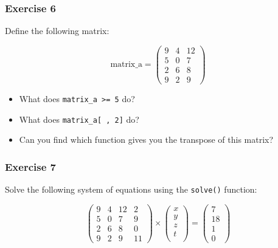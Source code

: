 \documentclass[]{gitbook}
\providecommand{\tightlist}{%
  \setlength{\itemsep}{0pt}\setlength{\parskip}{0pt}}
\theoremstyle{definition}
\theoremstyle{definition}
\theoremstyle{definition}
\theoremstyle{remark}
\begin{document}
\hypertarget{exercise-6}{%
\subsubsection*{Exercise 6}\label{exercise-6}}

Define the following matrix:

\[
\text{matrix_a} = \left(
\begin{array}{ccc}
 9 & 4 & 12 \\
 5 & 0 & 7 \\
 2 & 6 & 8 \\
 9 & 2 & 9
\end{array} \right)
\]

\begin{itemize}
\tightlist
\item
  What does \texttt{matrix\_a\ \textgreater{}=\ 5} do?
\item
  What does \texttt{matrix\_a{[}\ ,\ 2{]}} do?
\item
  Can you find which function gives you the transpose of this matrix?
\end{itemize}

\hypertarget{exercise-7}{%
\subsubsection*{Exercise 7}\label{exercise-7}}

Solve the following system of equations using the \texttt{solve()}
function:

\[
\left(
\begin{array}{cccc}
 9 & 4 & 12 & 2 \\
 5 & 0 & 7 & 9\\
 2 & 6 & 8 & 0\\
 9 & 2 & 9 & 11
\end{array} \right) \times \left(
\begin{array}{ccc}
 x \\
 y \\
 z \\
 t \\
\end{array}\right) =
\left(
\begin{array}{ccc}
7\\
18\\
1\\
0
\end{array}
\right)
\]
\end{document}

